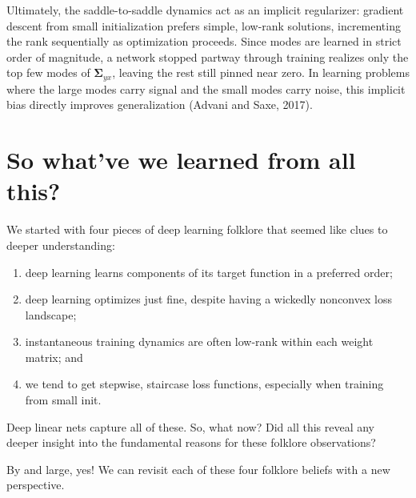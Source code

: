 \documentclass[12pt]{article}
\newcommand{\mSigma}{\boldsymbol{\Sigma}}
\begin{document}
Ultimately, the saddle-to-saddle dynamics act as an implicit regularizer: gradient descent from small initialization prefers simple, low-rank solutions, incrementing the rank sequentially as optimization proceeds. Since modes are learned in strict order of magnitude, a network stopped partway through training realizes only the top few modes of $\mSigma_{yx}$, leaving the rest still pinned near zero. In learning problems where the large modes carry signal and the small modes carry noise, this implicit bias directly improves generalization (Advani and Saxe, 2017).

\section{So what've we learned from all this?}

We started with four pieces of deep learning folklore that seemed like clues to deeper understanding:
\begin{enumerate}
    \item deep learning learns components of its target function in a preferred order;
    \item deep learning optimizes just fine, despite having a wickedly nonconvex loss landscape;
    \item instantaneous training dynamics are often low-rank within each weight matrix; and
    \item we tend to get stepwise, staircase loss functions, especially when training from small init.
\end{enumerate}
Deep linear nets capture all of these. So, what now? Did all this reveal any deeper insight into the fundamental reasons for these folklore observations?

By and large, yes! We can revisit each of these four folklore beliefs with a new perspective.
\end{document}
